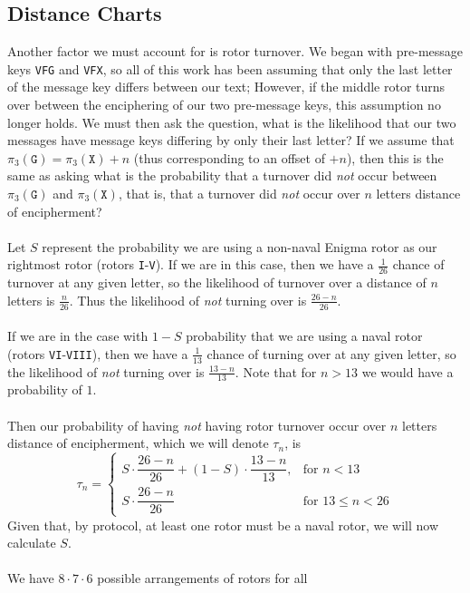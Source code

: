 \subsection{Distance Charts}\label{distance_chart}
Another factor we must account for is rotor turnover. We began with
pre-message keys \texttt{VFG} and \texttt{VFX}, so all of this work
has been assuming that only the last letter of the message key
differs between our text; However, if the middle rotor turns over
between the enciphering of our two pre-message keys, this
assumption no longer holds. We must then ask the question, what is
the likelihood that our two messages have message keys differing by
only their last letter? If we assume that $\pi_3(\texttt{G}) =
\pi_3(\texttt{X}) + n$ (thus corresponding to an offset of
$+n$), then this is the same as asking what is the probability that
a turnover did \emph{not} occur between $\pi_3(\texttt{G})$ and
$\pi_3(\texttt{X})$, that is, that a turnover did \emph{not}
occur over $n$ letters distance of encipherment?
\\\\Let $S$ represent the probability we are using a non-naval
Enigma rotor as our rightmost rotor (rotors \texttt{I}-\texttt{V}).
If we are in this case, then we have a $\frac{1}{26}$ chance of
turnover at any given letter, so the likelihood of turnover over a
distance of $n$ letters is $\frac{n}{26}$. Thus the likelihood
of \emph{not} turning over is $\frac{26-n}{26}$.
\\\\If we are in the case with $1-S$ probability that we are using
a naval rotor (rotors \texttt{VI}-\texttt{VIII}), then we have a
$\frac{1}{13}$ chance of turning over at any given letter, so the
likelihood of \emph{not} turning over is $\frac{13-n}{13}$. Note
that for $n>13$ we would have a probability of $1$.
\\\\Then our probability of having \emph{not} having rotor turnover
occur over $n$ letters distance of encipherment, which we will
denote $\tau_n$, is
\[
  \tau_n =
  \begin{cases}
    S \cdot \dfrac{26 - n}{26} + (1 - S) \cdot \dfrac{13 - n}{13},
    & \text{for } n < 13        \\
    S \cdot \dfrac{26 - n}{26}
    & \text{for } 13 \le n < 26
  \end{cases}
\]
Given that, by protocol, at least one rotor must be a naval rotor,
we will now calculate $S$.
\\\\We have $8\cdot7\cdot6$ possible arrangements of rotors for all
